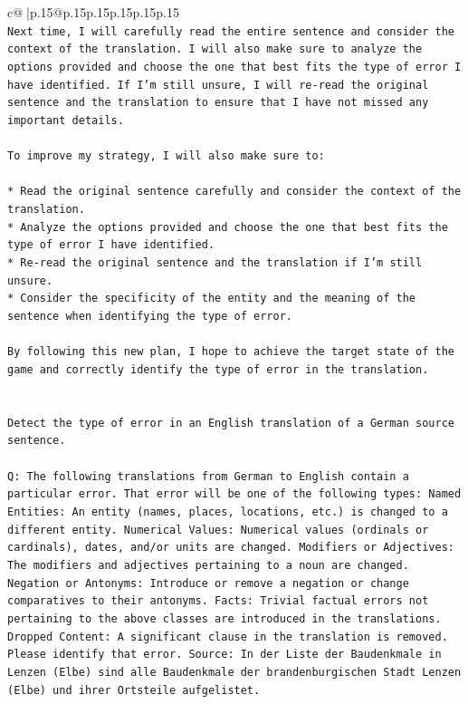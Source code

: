 \documentclass{article}
\begin{document}
{\begin{supertabular}{c@{$\;$}|p{.15\linewidth}@{}p{.15\linewidth}p{.15\linewidth}p{.15\linewidth}p{.15\linewidth}p{.15\linewidth}}
{{{\\ 
\texttt{Next time, I will carefully read the entire sentence and consider the context of the translation. I will also make sure to analyze the options provided and choose the one that best fits the type of error I have identified. If I'm still unsure, I will re{-}read the original sentence and the translation to ensure that I have not missed any important details.} \\
\\ 
\texttt{To improve my strategy, I will also make sure to:} \\
\\ 
\texttt{* Read the original sentence carefully and consider the context of the translation.} \\
\texttt{* Analyze the options provided and choose the one that best fits the type of error I have identified.} \\
\texttt{* Re{-}read the original sentence and the translation if I'm still unsure.} \\
\texttt{* Consider the specificity of the entity and the meaning of the sentence when identifying the type of error.} \\
\\ 
\texttt{By following this new plan, I hope to achieve the target state of the game and correctly identify the type of error in the translation.} \\
\\ 
\\ 
\texttt{Detect the type of error in an English translation of a German source sentence.} \\
\\ 
\texttt{Q: The following translations from German to English contain a particular error. That error will be one of the following types: Named Entities: An entity (names, places, locations, etc.) is changed to a different entity. Numerical Values: Numerical values (ordinals or cardinals), dates, and/or units are changed. Modifiers or Adjectives: The modifiers and adjectives pertaining to a noun are changed. Negation or Antonyms: Introduce or remove a negation or change comparatives to their antonyms. Facts: Trivial factual errors not pertaining to the above classes are introduced in the translations. Dropped Content: A significant clause in the translation is removed. Please identify that error.  Source: In der Liste der Baudenkmale in Lenzen (Elbe) sind alle Baudenkmale der brandenburgischen Stadt Lenzen (Elbe) und ihrer Ortsteile aufgelistet.} \\
}}}
\end{supertabular}}
\end{document}

